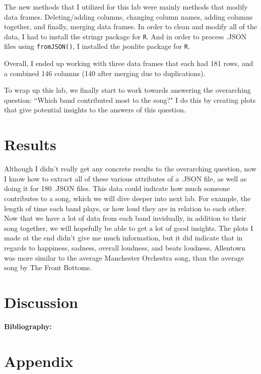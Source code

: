 \documentclass{article}\usepackage[]{graphicx}\usepackage[]{xcolor}
\begin{document}
\begin{multicols}{2}
The new methods that I utilized for this lab were mainly methods that modify data frames. Deleting/adding columns, changing column names, adding columns together, and finally, merging data frames. In order to clean and modify all of the data, I had to install the stringr \citep{stringr} package for \texttt{R}. And in order to process .JSON files using \texttt{fromJSON()}, I installed the jsonlite \citep{jsonlite} package for \texttt{R}.

Overall, I ended up working with three data frames that each had 181 rows, and a combined 146 columns (140 after merging due to duplications).

To wrap up this lab, we finally start to work towards answering the overarching question: ``Which band contributed most to the song?" I do this by creating plots that give potential insights to the answers of this question.


\section{Results}
Although I didn't really get any concrete results to the overarching question, now I know how to extract all of these various attributes of a .JSON file, as well as doing it for 180 .JSON files. This data could indicate how much someone contributes to a song, which we will dive deeper into next lab. For example,  the length of time each band plays, or how loud they are in relation to each other. Now that we have a lot of data from each band invidually, in addition to their song together, we will hopefully be able to get a lot of good insights. The plots I made at the end didn't give me much information, but it did indicate that in regards to happiness, sadness, overall loudness, and beats loudness, Allentown was more similar to the average Manchester Orchestra song, than the average song by The Front Bottoms.

\section{Discussion}


\vspace{2em}

\noindent\textbf{Bibliography:} 

\begin{tiny}

\end{tiny}
\end{multicols}


\newpage
\onecolumn
\section{Appendix}
\end{document}
